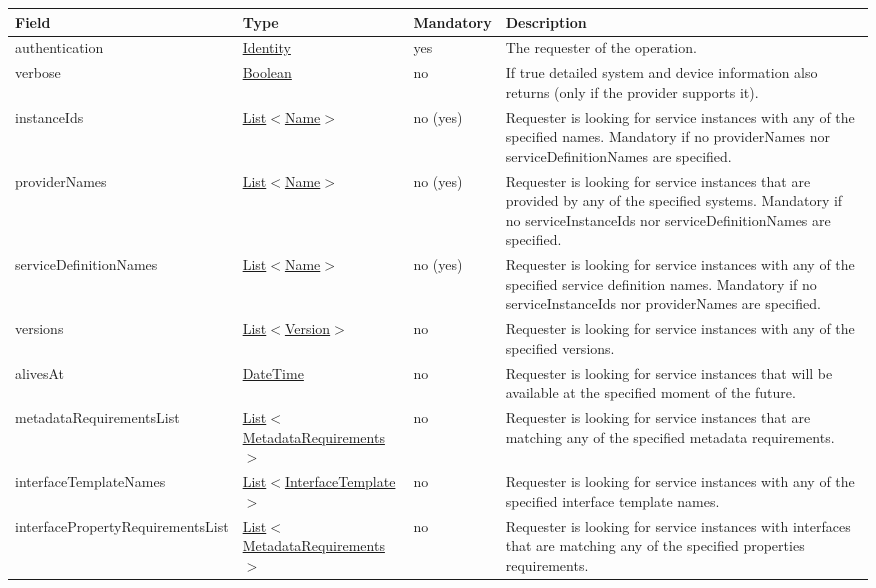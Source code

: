 \documentclass[a4paper]{arrowhead}
\newcommand{\pref}[1]{{\textcolor{ArrowheadGrey}{\hyperref[sec:model:primitives:#1]{#1}}}}
\begin{document}
\clearpage

\label{sec:model:ServiceLookupRequest}

\begin{table}[ht!]
\begin{tabularx}{\textwidth}{| p{5.3cm} | p{4.8cm} | p{2cm} | X |} \hline
\rowcolor{gray!33} Field & Type & Mandatory & Description \\ \hline
authentication & \hyperref[sec:model:Identity]{Identity} & yes & The requester of the ope\-ration. \\ \hline
verbose & \pref{Boolean} & no & If true detailed system and device information also returns (only if the provider supports it). \\ \hline
instanceIds &  \pref{List}$<$\pref{Name}$>$ & no (yes) & Requester is looking for service instances with any of the spe\-cified names. Mandatory if no providerNames nor serviceDefinitionNames are spe\-cified. \\ \hline
providerNames &  \pref{List}$<$\pref{Name}$>$ & no (yes) & Requester is looking for service ins\-tances that are provided by any of the specified systems. Mandatory if no serviceInstanceIds nor serviceDefinitionNames are spe\-cified. \\ \hline
serviceDefinitionNames &  \pref{List}$<$\pref{Name}$>$ & no (yes) & Requester is looking for service ins\-tances with any of the specified service definition names. Mandatory if no serviceInstanceIds nor providerNames are spe\-cified. \\ \hline
versions &  \pref{List}$<$\pref{Version}$>$ & no & Requester is looking for service ins\-tances with any of the specified versions. \\ \hline
alivesAt & \pref{DateTime} & no & Requester is looking for service ins\-tances that will be available at the specified moment of the future. \\ \hline
metadataRequirementsList & \pref{List}$<$\hyperref[sec:model:MetadataRequirements]{MetadataRequirements}$>$ & no & Requester is looking for service ins\-tances that are matching any of the specified metadata requirements.  \\ \hline
interfaceTemplateNames &  \pref{List}$<$\pref{InterfaceTemplate}$>$ & no & Requester is looking for service ins\-tances with any of the specified interface template names. \\ \hline
interfacePropertyRequirementsList & \pref{List}$<$\hyperref[sec:model:MetadataRequirements]{MetadataRequirements}$>$ & no & Requester is looking for service ins\-tances with interfaces that are matching any of the specified properties requirements.  \\ \hline
\end{tabularx}
\end{table}
\end{document}
